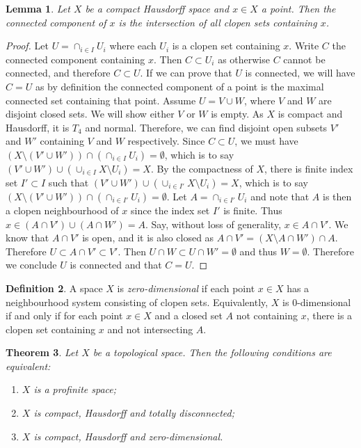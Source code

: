 \documentclass[12pt]{report}
\newtheorem{theorem}{Theorem}[section]
\newtheorem{lemma}[theorem]{Lemma}
\theoremstyle{definition}
\newtheorem{definition}[theorem]{Definition}
\begin{document}
\begin{lemma}\label{6.2.10}
	Let $X$ be a compact Hausdorff space and $x\in X$ a point. Then the connected component of $x$ is the intersection of all clopen sets containing $x$.
\end{lemma}

\begin{proof}
	Let $U=\cap_{i\in I}U_i$ where each $U_i$ is a clopen set containing $x$. Write $C$ the connected component containing $x$. Then $C\subset U_i$ as otherwise $C$ cannot be connected, and therefore $C\subset U$. If we can prove that $U$ is connected, we will have $C=U$ as by definition the connected component of a point is the maximal connected set containing that point. Assume $U=V\cup W$, where $V$ and $W$ are disjoint closed sets. We will show either $V$ or $W$ is empty. As $X$ is compact and Hausdorff, it is $T_4$ and normal. Therefore, we can find disjoint open subsets $V'$ and $W'$ containing $V$ and $W$ respectively. Since $C\subset U$, we must have $(X\setminus(V'\cup W')) \cap (\cap_{i\in I}U_i)=\emptyset$, which is to say $(V'\cup W')\cup(\cup_{i\in I} X\setminus U_i)=X$. By the compactness of $X$, there is finite index set $I'\subset I$ such that  $(V'\cup W')\cup(\cup_{i\in I'} X\setminus U_i)=X$, which is to say $(X\setminus(V'\cup W')) \cap (\cap_{i\in I'}U_i)=\emptyset$. Let $A=\cap_{i\in I'}U_i$ and note that $A$ is then a clopen neighbourhood of $x$ since the index set $I'$ is finite. Thus $x\in (A\cap V')\cup(A\cap W')=A$. Say, without loss of generality, $x\in A\cap V'$. We know that $A\cap V'$ is open, and it is also closed as $A\cap V'=(X\setminus A\cap W')\cap A$. Therefore $U\subset A\cap V'\subset V'$. Then $U\cap W\subset U\cap W'=\emptyset$ and thus $W=\emptyset$. Therefore we conclude $U$ is connected and that $C=U$.
\end{proof}

\begin{definition}
	A space $X$ is \emph{zero-dimensional} if each point $x\in X$ has a neighbourhood system consisting of clopen sets. Equivalently, $X$ is 0-dimensional if and only if for each point $x\in X$ and a closed set $A$ not containing $x$, there is a clopen set containing $x$ and not intersecting $A$.
\end{definition}

\begin{theorem}\label{6.2.12}
	Let $X$ be a topological space. Then the following conditions are equivalent:
	\begin{enumerate}
		\item $X$ is a profinite space;
		\item $X$ is compact, Hausdorff and totally disconnected;
		\item $X$ is compact, Hausdorff and zero-dimensional.
	\end{enumerate}
\end{theorem}
\end{document}
